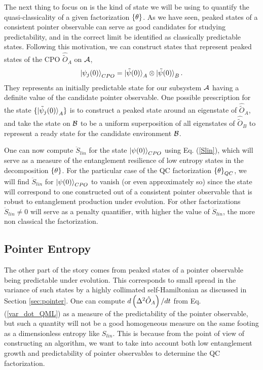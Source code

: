 \documentclass[aps,pra,onecolumn,nofootinbib,notitlepage,11pt,tightenlines]{revtex4-1}
\begin{document}
The next thing to focus on is the kind of state we will be using to quantify the quasi-classicality of a given factorization ${\{\theta\}}$. As we have seen, peaked states of a consistent pointer observable can serve as good candidates for studying predictability, and in the correct limit be identified as classically predictable states.
Following this motivation, we can construct states that represent peaked states of the CPO $\hat{\tilde{O}}_{A}$ on $\mathcal{A}$, 
\begin{equation}
\ket{\psi_{j}(0)}_{CPO} = \ket{\tilde{\psi} (0)}_{A} \otimes \ket{\tilde{\psi} (0)}_{B}. 
\end{equation}
They represents an initially predictable state for our subsystem $\mathcal{A}$ having a definite value of the candidate pointer observable. One possible prescription for the state $\{\ket{\tilde{\psi}_{j} (0)}_{A}\}$ is to construct a peaked state around an eigenstate of $\hat{\tilde{O}}_{A}$, and take the state on $\mathcal{B}$ to be a uniform superposition of all eigenstates of $\hat{\tilde{O}}_{B}$ to represent a ready state for the candidate environment $\mathcal{B}$. 

One can now compute $\ddot{S}_{lin}$ for the state $\ket{\psi(0)}_{CPO}$ using Eq. (\ref{Slin}), which will serve as a measure of the entanglement resilience of low entropy states in the decomposition ${\{\theta\}}$. For the particular case of the QC factorization ${\{\theta\}}_{QC}$, we will find $\ddot{S}_{lin}$ for $\ket{\psi(0)}_{CPO}$ to  {vanish} (or even approximately so) since the state will correspond to one constructed out of a consistent pointer observable that is robust to entanglement production under evolution. For other factorizations $\ddot{S}_{lin} \neq 0$ will serve as a penalty quantifier, with higher the value of $\ddot{S}_{lin}$, the more non classical the factorization. 

\subsection{Pointer Entropy}

The other part of the story comes from peaked states of a pointer observable being predictable under evolution. This corresponds to small spread in the variance of such states by a highly collimated self-Hamiltonian as discussed in Section \ref{sec:pointer}. One can compute $d \left(\Delta^{2} \hat{O}_{A}\right)/dt$ from Eq. (\ref{var_dot_QML}) as a measure of the predictability of the pointer observable, but such a quantity will not be a good homogeneous measure on the same footing as a dimensionless entropy like $S_{lin}$. This is because from the point of view of constructing an algorithm, we want to take into account both low entanglement growth and predictability of pointer observables to determine the QC factorization. 
\end{document}
